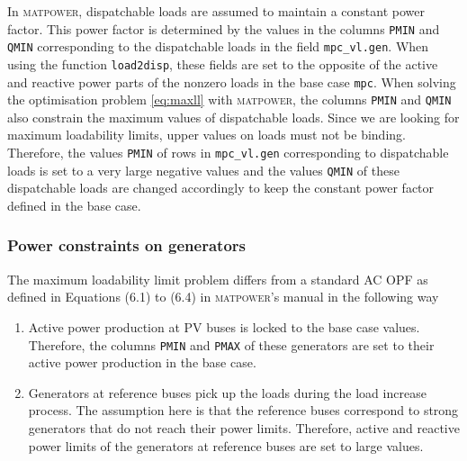 \documentclass[12pt,a4]{article}
\newcommand*{\codemat}[1]{\texttt{#1}}
\newcommand*{\matpower}{\textsc{matpower}}
\begin{document}
In \matpower, dispatchable loads are assumed to maintain a constant power factor. 
This power factor is determined by the values in the columns \codemat{PMIN} and \codemat{QMIN} corresponding to the dispatchable loads in the field \codemat{mpc\_vl.gen}.
When using the function \codemat{load2disp}, these fields are set to the opposite of the active and reactive power parts of the nonzero loads in the base case \codemat{mpc}.
When solving the optimisation problem \eqref{eq:maxll} with \matpower, the columns \codemat{PMIN} and \codemat{QMIN} also constrain the maximum values of dispatchable loads.
Since we are looking for maximum loadability limits, upper values on loads must not be binding.
Therefore, the values \codemat{PMIN} of rows in \codemat{mpc\_vl.gen} corresponding to dispatchable loads is set to a very large negative values and the values \codemat{QMIN} of these dispatchable loads are changed accordingly to keep the constant power factor defined in the base case.

\subsubsection{Power constraints on generators}
\label{sec:constr-gen}


The maximum loadability limit problem differs from a standard AC OPF as defined in Equations (6.1) to (6.4) in \matpower's manual in the following way
\begin{enumerate}
\item Active power production at PV buses is locked to the base case values. Therefore, the columns \codemat{PMIN} and \codemat{PMAX} of these generators are set to their active power production in the base case.
\item Generators at reference buses pick up the loads during the load increase process. The assumption here is that the reference buses correspond to strong generators that do not reach their power limits. Therefore, active and reactive power limits of the generators at reference buses are set to large values.
\end{enumerate}
\end{document}
